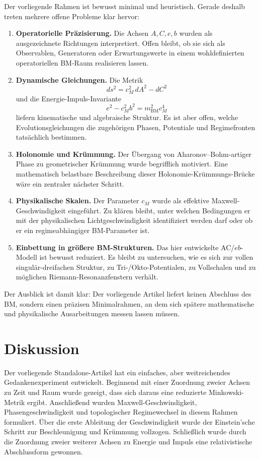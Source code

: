 \documentclass[11pt,a4paper]{article}
\theoremstyle{definition}
\theoremstyle{plain}
\begin{document}
	Der vorliegende Rahmen ist bewusst minimal und heuristisch. Gerade deshalb treten mehrere offene Probleme klar hervor:
	\begin{enumerate}[leftmargin=2em]
		\item \textbf{Operatorielle Präzisierung.} Die Achsen $A,C,e,b$ wurden als ausgezeichnete Richtungen interpretiert. Offen bleibt, ob sie sich als Observablen, Generatoren oder Erwartungswerte in einem wohldefinierten operatoriellen BM-Raum realisieren lassen.
		\item \textbf{Dynamische Gleichungen.} Die Metrik
		\[
		ds^2 = c_M^2\, dA^2 - dC^2
		\]
		und die Energie-Impuls-Invariante
		\[
		e^2 - c_M^2 b^2 = m_{\mathrm{BM}}^2 c_M^4
		\]
		liefern kinematische und algebraische Struktur. Es ist aber offen, welche Evolutionsgleichungen die zugehörigen Phasen, Potentiale und Regimefronten tatsächlich bestimmen.
		\item \textbf{Holonomie und Krümmung.} Der Übergang von Aharonov--Bohm-artiger Phase zu geometrischer Krümmung wurde begrifflich motiviert. Eine mathematisch belastbare Beschreibung dieser Holonomie-Krümmungs-Brücke wäre ein zentraler nächster Schritt.
		\item \textbf{Physikalische Skalen.} Der Parameter $c_M$ wurde als effektive Maxwell-Geschwindigkeit eingeführt. Zu klären bleibt, unter welchen Bedingungen er mit der physikalischen Lichtgeschwindigkeit identifiziert werden darf oder ob er ein regimeabhängiger BM-Parameter ist.
		\item \textbf{Einbettung in größere BM-Strukturen.} Das hier entwickelte AC/$e b$-Modell ist bewusst reduziert. Es bleibt zu untersuchen, wie es sich zur vollen singulär-dreifachen Struktur, zu Tri-/Okto-Potentialen, zu Vollschalen und zu möglichen Riemann-Resonanzfenstern verhält.
	\end{enumerate}
	
	Der Ausblick ist damit klar: Der vorliegende Artikel liefert keinen Abschluss des BM, sondern einen präzisen Minimalrahmen, an dem sich spätere mathematische und physikalische Ausarbeitungen messen lassen müssen.
	
	\section{Diskussion}
	
	Der vorliegende Standalone-Artikel hat ein einfaches, aber weitreichendes Gedankenexperiment entwickelt. Beginnend mit einer Zuordnung zweier Achsen zu Zeit und Raum wurde gezeigt, dass sich daraus eine reduzierte Minkowski-Metrik ergibt. Anschließend wurden Maxwell-Geschwindigkeit, Phasengeschwindigkeit und topologischer Regimewechsel in diesem Rahmen formuliert. Über die erste Ableitung der Geschwindigkeit wurde der Einstein’sche Schritt zur Beschleunigung und Krümmung vollzogen. Schließlich wurde durch die Zuordnung zweier weiterer Achsen zu Energie und Impuls eine relativistische Abschlussform gewonnen.
	
\end{document}
